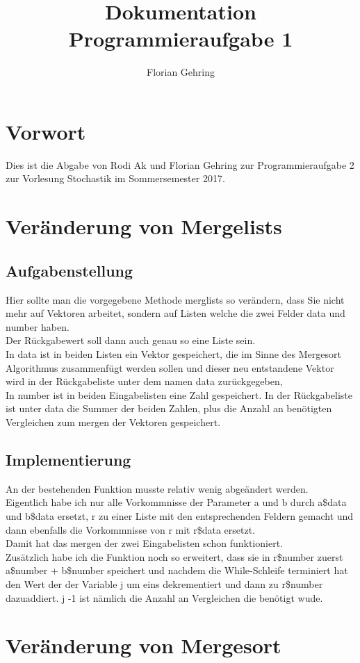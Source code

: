 \documentclass[a4paper, 10pt]{article}
\author{Florian Gehring}
\title{Dokumentation Programmieraufgabe 1}
\begin{document}
\section{Vorwort}
Dies ist die Abgabe von Rodi Ak und Florian Gehring zur Programmieraufgabe 2 zur Vorlesung Stochastik im Sommersemester 2017. \\
\section{Veränderung von Mergelists}
\subsection{Aufgabenstellung}
Hier sollte man die vorgegebene Methode merglists so verändern, dass Sie nicht mehr auf Vektoren arbeitet, sondern auf Listen welche die zwei Felder data und number haben. \\
Der Rückgabewert soll dann auch genau so eine Liste sein.\\
In data ist in beiden Listen ein Vektor gespeichert, die im Sinne des Mergesort Algorithmus zusammenfügt werden sollen und dieser neu entstandene Vektor wird in der Rückgabeliste unter dem namen data zurückgegeben, \\
In number ist in beiden Eingabelisten eine Zahl gespeichert. In der Rückgabeliste ist unter data die Summer der beiden Zahlen, plus die Anzahl an benötigten Vergleichen zum mergen der Vektoren gespeichert.\\
\subsection{Implementierung}
An der bestehenden Funktion musste relativ wenig abgeändert werden.\\
Eigentlich habe ich nur alle Vorkommnisse der Parameter a und b durch a\$data und b\$data ersetzt, r zu einer Liste mit den entsprechenden Feldern gemacht und dann ebenfalls die Vorkommnisse von r mit r\$data ersetzt. \\
Damit hat das mergen der zwei Eingabelisten schon funktioniert. \\
Zusätzlich habe ich die Funktion noch so erweitert, dass sie in r\$number zuerst a\$number + b\$number speichert und nachdem die While-Schleife terminiert hat den Wert der der Variable j um eins dekrementiert und dann zu r\$number dazuaddiert. j -1 ist nämlich die Anzahl an Vergleichen die benötigt wude.
\section{Veränderung von Mergesort}
\end{document}
